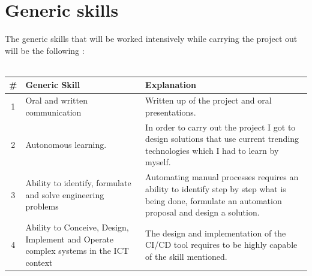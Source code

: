 \documentclass[a4paper]{article}
\begin{document}
\section{Generic skills}

The generic skills that will be worked intensively while carrying the project out will be the following :
\\~\\
\begin{tabularx}{\textwidth}{|c|X|X|}
	\hline
	\textbf{\#} & \textbf{Generic Skill} & \textbf{Explanation} \\ \hline
	1  & Oral and written communication & Written up of the project and oral presentations.\\ \hline
	2  & Autonomous learning. & In order to carry out the project I got to design solutions that use current trending technologies which I had to learn by myself. \\ \hline
	3  & Ability to identify, formulate and solve engineering problems & Automating manual processes requires an ability to identify step by step what is being done, formulate an automation proposal and design a solution.  \\ \hline
	4  & Ability to Conceive, Design, Implement and Operate complex systems in the ICT context & The design and implementation of the CI/CD tool requires to be highly capable of the skill mentioned.
	     \\ \hline
\end{tabularx}
\end{document}
